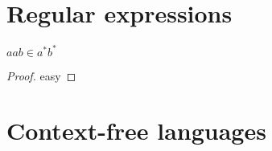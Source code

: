 %

\chapter{Regular expressions}

\begin{theorem}\label{thm:my_first_theorem}
\leanok
$aab \in a^* b^*$
\end{theorem}
\begin{proof}
\leanok
easy
\end{proof}




\chapter{Context-free languages}


